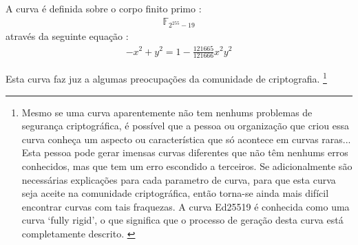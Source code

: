 \begin{enumerate}
A curva é definida sobre o corpo finito primo : 
\vspace{.175cm}
\begin{align*}
\mathbb{F}_{2^{255} - 19}
\end{align*}
através da seguinte equação : 
\vspace{.175cm}
\begin{align*}
-x^2 + y^2 = 1 - \frac{121665}{121666} x^2 y^2
\end{align*}

Esta curva faz juz a algumas preocupações da comunidade de criptografia.
\footnote{Mesmo se uma curva aparentemente não tem nenhums problemas de segurança criptográfica, é possível que a pessoa ou organização que criou essa curva conheça um aspecto ou característica que só acontece em curvas raras... Esta pessoa pode gerar imensas curvas diferentes que não têm nenhums erros conhecidos, mas que tem um erro escondido a terceiros. Se adicionalmente são necessárias explicações para cada parametro de curva, para que esta curva seja aceite na comunidade criptográfica, então torna-se ainda mais difícil encontrar curvas com tais fraquezas. A curva Ed25519 é conhecida como uma curva `fully rigid', o que significa que o processo de geração desta curva está completamente descrito. \cite{elliptic-curve-rigidity} }  


\end{enumerate}
